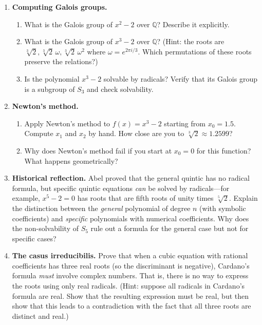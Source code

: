 \begin{enumerate}
    \item \textbf{Computing Galois groups.}
    \begin{enumerate}
        \item What is the Galois group of $x^2 - 2$ over $\mathbb{Q}$? Describe it explicitly.
        \item What is the Galois group of $x^3 - 2$ over $\mathbb{Q}$? (Hint: the roots are $\sqrt[3]{2}, \sqrt[3]{2}\,\omega, \sqrt[3]{2}\,\omega^2$ where $\omega = e^{2\pi i/3}$. Which permutations of these roots preserve the relations?)
        \item Is the polynomial $x^3 - 2$ solvable by radicals? Verify that its Galois group is a subgroup of $S_3$ and check solvability.
    \end{enumerate}

    \item \textbf{Newton's method.}
    \begin{enumerate}
        \item Apply Newton's method to $f(x) = x^3 - 2$ starting from $x_0 = 1.5$. Compute $x_1$ and $x_2$ by hand. How close are you to $\sqrt[3]{2} \approx 1.2599$?
        \item Why does Newton's method fail if you start at $x_0 = 0$ for this function? What happens geometrically?
    \end{enumerate}

    \item \textbf{Historical reflection.} Abel proved that the general quintic has no radical formula, but specific quintic equations \emph{can} be solved by radicals---for example, $x^5 - 2 = 0$ has roots that are fifth roots of unity times $\sqrt[5]{2}$. Explain the distinction between the \emph{general} polynomial of degree $n$ (with symbolic coefficients) and \emph{specific} polynomials with numerical coefficients. Why does the non-solvability of $S_5$ rule out a formula for the general case but not for specific cases?

    \item[$\star$] \textbf{The casus irreducibilis.} Prove that when a cubic equation with rational coefficients has three real roots (so the discriminant is negative), Cardano's formula \emph{must} involve complex numbers. That is, there is no way to express the roots using only real radicals. (Hint: suppose all radicals in Cardano's formula are real. Show that the resulting expression must be real, but then show that this leads to a contradiction with the fact that all three roots are distinct and real.)

\end{enumerate}
